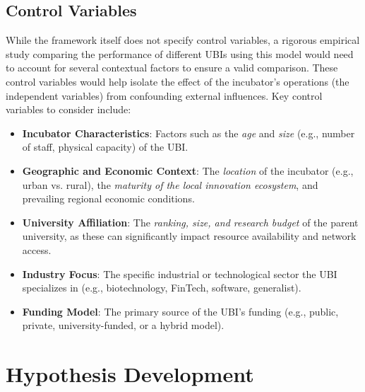 \documentclass[../Main.tex]{subfiles}
\begin{document}
\subsection{Control Variables}
While the framework itself does not specify control variables, a rigorous empirical study comparing the performance of different UBIs using this model would need to account for several contextual factors to ensure a valid comparison. These control variables would help isolate the effect of the incubator's operations (the independent variables) from confounding external influences. Key control variables to consider include:
\begin{itemize}
    \item \textbf{Incubator Characteristics}: Factors such as the \textit{age} and \textit{size} (e.g., number of staff, physical capacity) of the UBI.
    \item \textbf{Geographic and Economic Context}: The \textit{location} of the incubator (e.g., urban vs. rural), the \textit{maturity of the local innovation ecosystem}, and prevailing regional economic conditions.
    \item \textbf{University Affiliation}: The \textit{ranking, size, and research budget} of the parent university, as these can significantly impact resource availability and network access.
    \item \textbf{Industry Focus}: The specific industrial or technological sector the UBI specializes in (e.g., biotechnology, FinTech, software, generalist).
    \item \textbf{Funding Model}: The primary source of the UBI's funding (e.g., public, private, university-funded, or a hybrid model).
\end{itemize}

\section{Hypothesis Development}
\end{document}
